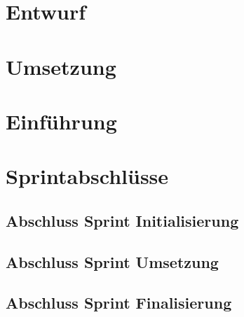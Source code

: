 \chapter{Entwurf}



\chapter{Umsetzung}



\chapter{Einführung}

\chapter{Sprintabschlüsse}

\section{Abschluss Sprint Initialisierung}

\section{Abschluss Sprint Umsetzung}

\section{Abschluss Sprint Finalisierung}


